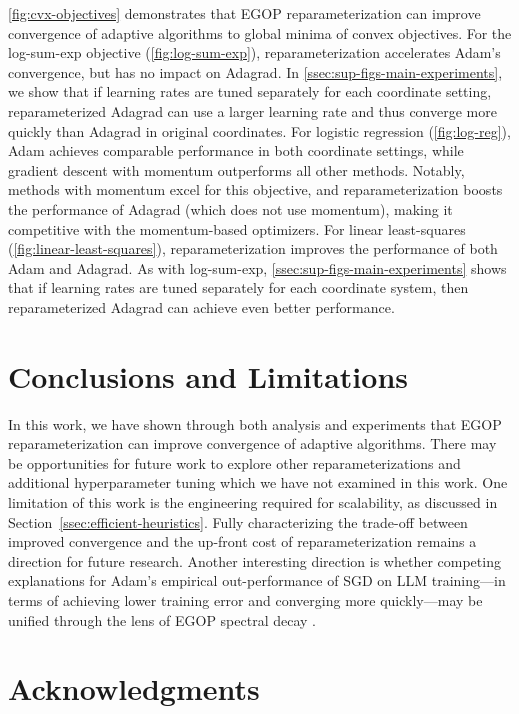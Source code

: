 \documentclass{article}
\begin{document}
\cref{fig:cvx-objectives} demonstrates that EGOP reparameterization can improve convergence of adaptive algorithms to global minima of convex objectives. For the log-sum-exp objective (\cref{fig:log-sum-exp}), reparameterization accelerates Adam's convergence, but has no impact on Adagrad. In \cref{ssec:sup-figs-main-experiments}, we show that if learning rates are tuned separately for each coordinate setting, reparameterized Adagrad can use a larger learning rate and thus converge more quickly than Adagrad in original coordinates. For logistic regression (\cref{fig:log-reg}), Adam achieves comparable performance in both coordinate settings, while gradient descent with momentum outperforms all other methods. Notably, methods with momentum excel for this objective, and reparameterization boosts the performance of Adagrad (which does not use momentum), making it competitive with the momentum-based optimizers.  For linear least-squares (\cref{fig:linear-least-squares}), reparameterization improves the performance of both Adam and Adagrad. As with log-sum-exp, \cref{ssec:sup-figs-main-experiments} shows that if learning rates are tuned separately for each coordinate system, then reparameterized Adagrad can achieve even better performance.

\section{Conclusions and Limitations}

In this work, we have shown through both analysis and experiments that EGOP reparameterization can improve convergence of adaptive algorithms. There may be opportunities for future work to explore other reparameterizations and additional hyperparameter tuning which we have not examined in this work. One limitation of this work is the engineering required for scalability, as discussed in Section~\ref{ssec:efficient-heuristics}. Fully characterizing the trade-off between improved convergence and the up-front cost of reparameterization remains a direction for future research. Another interesting direction
is whether competing explanations for Adam's empirical out-performance of SGD on LLM training---in terms of achieving lower training error and converging more quickly---may be unified through the lens of EGOP spectral decay \cite{kunstner2024heavy,zhang2024transformers}.

\section*{Acknowledgments}
\end{document}
